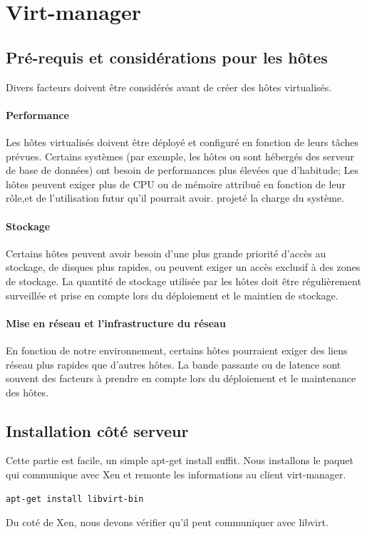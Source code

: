 \chapter{Virt-manager}
\section{Pré-requis et considérations pour les hôtes}
Divers facteurs doivent être considérés avant de créer des hôtes virtualisés.
\subsubsection{Performance} 
Les hôtes virtualisés doivent être déployé et configuré en fonction de leurs tâches prévues. Certains systèmes (par exemple, les hôtes ou sont hébergés des serveur de base de données) ont besoin de performances plus élevées que d'habitude; Les hôtes peuvent exiger plus de CPU ou de mémoire attribué en fonction de leur rôle,et de l'utilisation futur qu'il pourrait avoir. projeté la charge du système.
\subsubsection{Stockage}
Certains hôtes peuvent avoir besoin d'une plus grande priorité d'accès au stockage, de disques plus rapides, ou peuvent exiger un accès exclusif à des zones de stockage. La quantité de stockage utilisée par les hôtes doit être régulièrement surveillée et prise en compte lors du déploiement et le maintien de stockage.
\subsubsection{Mise en réseau et l'infrastructure du réseau}
 En fonction de notre environnement, certains hôtes pourraient exiger des liens réseau plus rapides que d'autres hôtes. La bande passante ou de latence sont souvent des facteurs à prendre en compte lors du déploiement et le maintenance des hôtes.
\section{Installation côté serveur}
Cette partie est facile, un simple apt-get install suffit. Nous installons le paquet qui communique avec Xen et remonte les informations au client virt-manager.
\begin{lstlisting}
apt-get install libvirt-bin
\end{lstlisting} 
Du coté de Xen, nous devons vérifier qu’il peut communiquer avec libvirt.

